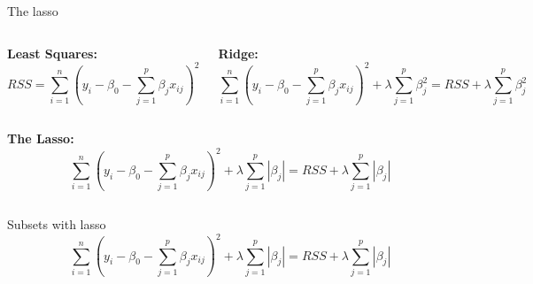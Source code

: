 \documentclass[aspectratio=169,usenames,dvipsnames]{beamer}
\newcommand{\InstructorList}[1]{
\begin{itemize}
	\color{orange}
	#1
\end{itemize}
}
\renewcommand{\InstructorList}[1]{}
\begin{document}
\begin{frame}[t]{The lasso}

\begin{columns}
\centering
\textbf{Least Squares:}
\footnotesize
\begin{equation*}
	RSS = \sum_{i=1}^n \left(y_i - \beta_0 - \sum_{j=1}^p \beta_j x_{ij}\right)^2
\end{equation*}

\centering
\footnotesize
\textbf{Ridge:}
\begin{equation*}
	\sum_{i=1}^n \left(y_i - \beta_0 - \sum_{j=1}^p \beta_j x_{ij}\right)^2 + \lambda \sum_{j=1}^p \beta_j^2 = RSS + \lambda \sum_{j=1}^p \beta_j^2
\end{equation*}

\end{columns}
\centering
\qquad

\textbf{The Lasso:}
\begin{equation*}
	\sum_{i=1}^n \left(y_i - \beta_0 - \sum_{j=1}^p \beta_j x_{ij}\right)^2
		+ \lambda \sum_{j=1}^p |\beta_j|
	= RSS + \lambda \sum_{j=1}^p |\beta_j|
\end{equation*}

\begin{columns}
\centering
\footnotesize
\InstructorList{
\item $\ell_1$ penalty instead of $\ell_2$ penalty
\item $\ell_1$ norm: $\|\beta \|_1 = \sum |\beta_j|$
\item $\ell_2$ norm: $\|\beta \|_2 = \sum \beta_j^2$
\item $\ell_p$ norm: $\|\beta\|_p = (\sum |\beta_j|^p)^{1/p}$
\item $\ell_\infty$ norm: $\|\beta\|_\infty = \max \{|\beta_i|\}$
}
\centering

\footnotesize

\end{columns}

\end{frame}
\begin{frame}[t]{Subsets with lasso}
	\begin{equation*}
		\sum_{i=1}^n \left(y_i - \beta_0 - \sum_{j=1}^p \beta_j x_{ij}\right)^2
			+ \lambda \sum_{j=1}^p |\beta_j|
		= RSS + \lambda \sum_{j=1}^p |\beta_j|
	\end{equation*}
\begin{columns}
\centering
\InstructorList{
\item Result of $\ell_1$ penalty is that it forces some coefficients to be exactly 0
\item Can be interpreted as something more like subset selection, but here called \textit{variable selection}
\item Yield are \textit{sparse} models, that is those using only a subset of variables
\item Selecing good $\lambda$ is critical
}
\centering

\end{columns}

\end{frame}
\end{document}
